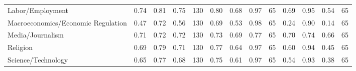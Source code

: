 \begin{longtable}{lrrrlrrrlrrrl}
                  Labor/Employment &            0.74 &             0.81 &          0.75 &           130 &              0.80 &               0.68 &            0.97 &              65 &              0.69 &               0.95 &            0.54 &              65 \\
Macroeconomics/Economic Regulation &            0.47 &             0.72 &          0.56 &           130 &              0.69 &               0.53 &            0.98 &              65 &              0.24 &               0.90 &            0.14 &              65 \\
                  Media/Journalism &            0.71 &             0.72 &          0.72 &           130 &              0.73 &               0.69 &            0.77 &              65 &              0.70 &               0.74 &            0.66 &              65 \\
                          Religion &            0.69 &             0.79 &          0.71 &           130 &              0.77 &               0.64 &            0.97 &              65 &              0.60 &               0.94 &            0.45 &              65 \\
                Science/Technology &            0.65 &             0.77 &          0.68 &           130 &              0.75 &               0.61 &            0.97 &              65 &              0.54 &               0.93 &            0.38 &              65 \\
\end{longtable}
